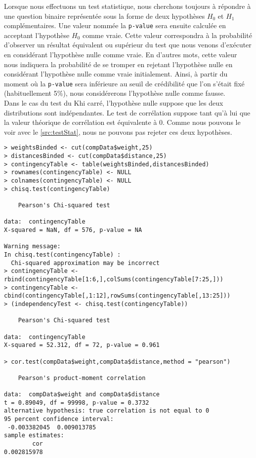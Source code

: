 Lorsque nous effectuons un test statistique, nous cherchons toujours à répondre à une question binaire représentée sous la forme de deux hypothèses $H_0$ et $H_1$ complémentaires. Une valeur nommée la \texttt{p-value} sera ensuite calculée en acceptant l'hypothèse $H_0$ comme vraie. Cette valeur correspondra à la probabilité d'observer un résultat équivalent ou supérieur du test que nous venons d'exécuter en considérant l'hypothèse nulle comme vraie. En d'autres mots, cette valeur nous indiquera la probabilité de se tromper en rejetant l'hypothèse nulle en considérant l'hypothèse nulle comme vraie initialement. Ainsi, à partir du moment où la \texttt{p-value} sera inférieure au seuil de crédibilité que l'on s'était fixé (habituellement 5\%), nous considérerons l'hypothèse nulle comme fausse. \\ 

Dans le cas du test du Khi carré, l'hypothèse nulle suppose que les deux distributions sont indépendantes. Le test de corrélation suppose tant qu'à lui que la valeur théorique de corrélation est équivalente à 0. Comme nous pouvons le voir avec le \autoref{src:testStat}, nous ne pouvons pas rejeter ces deux hypothèses. \\

\begin{lstlisting}[caption = Tests d'indépendance et de corrélation entre distributions,label=src:testStat]
> weightsBinded <- cut(compData$weight,25)
> distancesBinded <- cut(compData$distance,25)
> contingencyTable <- table(weightsBinded,distancesBinded)
> rownames(contingencyTable) <- NULL
> colnames(contingencyTable) <- NULL
> chisq.test(contingencyTable)

	Pearson's Chi-squared test

data:  contingencyTable
X-squared = NaN, df = 576, p-value = NA

Warning message:
In chisq.test(contingencyTable) :
  Chi-squared approximation may be incorrect
> contingencyTable <- rbind(contingencyTable[1:6,],colSums(contingencyTable[7:25,]))
> contingencyTable <- cbind(contingencyTable[,1:12],rowSums(contingencyTable[,13:25]))
> (independencyTest <- chisq.test(contingencyTable))

	Pearson's Chi-squared test

data:  contingencyTable
X-squared = 52.312, df = 72, p-value = 0.961

> cor.test(compData$weight,compData$distance,method = "pearson")

	Pearson's product-moment correlation

data:  compData$weight and compData$distance
t = 0.89049, df = 99998, p-value = 0.3732
alternative hypothesis: true correlation is not equal to 0
95 percent confidence interval:
 -0.003382045  0.009013785
sample estimates:
        cor 
0.002815978 
\end{lstlisting}

